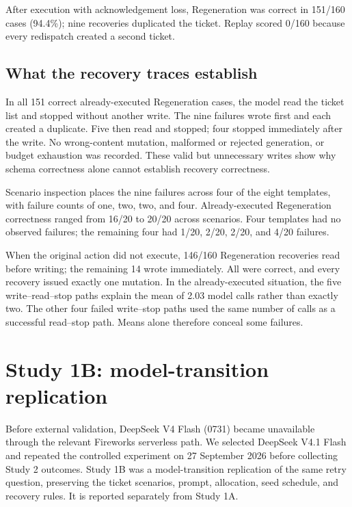 \documentclass[conference]{IEEEtran}
\begin{document}
After execution with acknowledgement loss, Regeneration was correct in 151/160 cases (94.4\%); nine recoveries duplicated the ticket. Replay scored 0/160 because every redispatch created a second ticket.


\subsection{What the recovery traces establish}

In all 151 correct already-executed Regeneration cases, the model read the ticket list and stopped without another write. The nine failures wrote first and each created a duplicate. Five then read and stopped; four stopped immediately after the write. No wrong-content mutation, malformed or rejected generation, or budget exhaustion was recorded. These valid but unnecessary writes show why schema correctness alone cannot establish recovery correctness.


Scenario inspection places the nine failures across four of the eight templates, with failure counts of one, two, two, and four. Already-executed Regeneration correctness ranged from 16/20 to 20/20 across scenarios. Four templates had no observed failures; the remaining four had 1/20, 2/20, 2/20, and 4/20 failures.


When the original action did not execute, 146/160 Regeneration recoveries read before writing; the remaining 14 wrote immediately. All were correct, and every recovery issued exactly one mutation. In the already-executed situation, the five write--read--stop paths explain the mean of 2.03 model calls rather than exactly two. The other four failed write--stop paths used the same number of calls as a successful read--stop path. Means alone therefore conceal some failures.


\section{Study 1B: model-transition replication}

Before external validation, DeepSeek V4 Flash (0731) became unavailable through the relevant Fireworks serverless path. We selected DeepSeek V4.1 Flash and repeated the controlled experiment on 27 September 2026 before collecting Study 2 outcomes. Study 1B was a model-transition replication of the same retry question, preserving the ticket scenarios, prompt, allocation, seed schedule, and recovery rules. It is reported separately from Study 1A.
\end{document}
